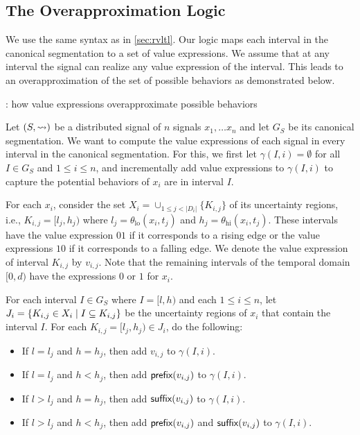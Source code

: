%

\subsection{The Overapproximation Logic}
We use the same syntax as in \cref{sec:rvltl}.
Our logic maps each interval in the canonical segmentation to a set of value expressions.
We assume that at any interval the signal can realize any value expression of the interval.
This leads to an overapproximation of the set of possible behaviors as demonstrated below.

\begin{example}
	\TODO: how value expressions overapproximate possible behaviors
\end{example}

Let $(S,{\rightsquigarrow})$ be a distributed signal of $n$ signals $x_1, \ldots x_n$ and let $G_S$ be its canonical segmentation.
We want to compute the value expressions of each signal in every interval in the canonical segmentation.
For this, we first let $\gamma(I, i) = \emptyset$ for all $I \in G_S$ and $1 \leq i \leq n$, and incrementally add value expressions to $\gamma(I, i)$ to capture the potential behaviors of $x_i$ are in interval $I$.

For each $x_i$, consider the set $X_i = \cup_{1 \leq j < |D_i|} \{K_{i,j}\}$ of its uncertainty regions, i.e.,  $K_{i,j} = [l_j, h_j)$ where $l_j = \theta_{\text{lo}}(x_i, t_j)$ and $h_j = \theta_{\text{hi}}(x_i, t_j)$.
These intervals have the value expression $01$ if it corresponds to a rising edge or the value expressions $10$ if it corresponds to a falling edge.
We denote the value expression of interval $K_{i,j}$ by $v_{i,j}$.
Note that the remaining intervals of the temporal domain $[0,d)$ have the expressions $0$ or $1$ for $x_i$.

For each interval $I \in G_S$ where $I = [l,h)$ and each $1 \leq i \leq n$, let $J_i = \{ K_{i,j} \in X_i \st I \subseteq K_{i,j}\}$ be the uncertainty regions of $x_i$ that contain the interval $I$.
For each $K_{i,j} = [l_j, h_j) \in J_i$, do the following:
\begin{itemize}
	\item If $l = l_j$ and $h = h_j$, then add $v_{i,j}$ to $\gamma(I, i)$.
	\item If $l = l_j$ and $h < h_j$, then add $\textsf{prefix}(v_{i,j})$ to $\gamma(I,i)$.
	\item If $l > l_j$ and $h = h_j$, then add $\textsf{suffix}(v_{i,j})$ to $\gamma(I,i)$.
	\item If $l > l_j$ and $h < h_j$, then add $\textsf{prefix}(v_{i,j})$ and $\textsf{suffix}(v_{i,j})$ to $\gamma(I,i)$.
\end{itemize}

